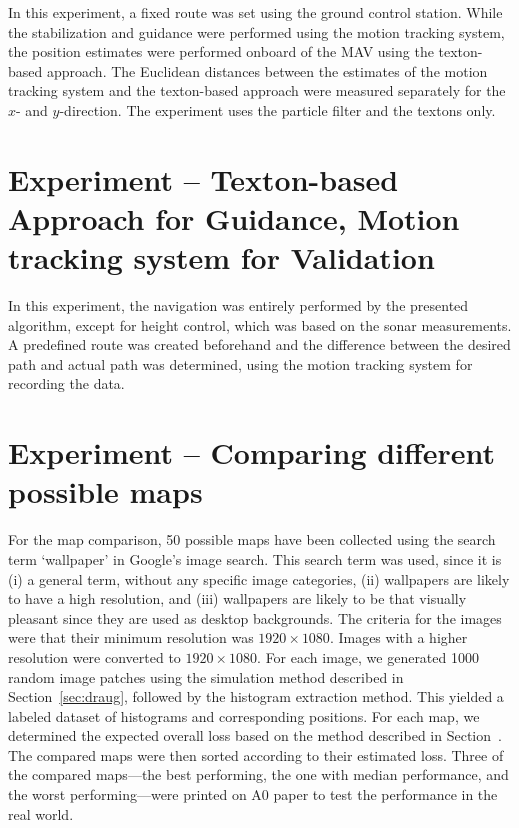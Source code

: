 In this experiment, a fixed route was set using the ground control
station. While the stabilization and guidance were performed using
the motion tracking system, the position estimates were performed onboard
of the MAV using the texton-based approach. The Euclidean distances between the estimates of the motion tracking system and the texton-based approach
were measured separately for the $x$- and $y$-direction. The experiment uses the
particle filter and the textons only.

\section{Experiment -- Texton-based Approach for Guidance, Motion tracking system for Validation}
\label{sec:experiment-6}

In this experiment, the navigation was entirely performed by
the presented algorithm, except for height control, which was based on
the sonar measurements. A predefined route was created beforehand and
the difference between the desired path and actual path was
determined, using the motion tracking system for recording the data.

\section{Experiment -- Comparing different possible maps}

For the map comparison, 50 possible maps have been collected using the
search term `wallpaper' in Google's image search. This search term was
used, since it is (i) a general term, without any specific image
categories, (ii) wallpapers are likely to have a high resolution, and
(iii) wallpapers are likely to be that visually pleasant since they
are used as desktop backgrounds. The criteria for the images were that
their minimum resolution was $1920 \times 1080$. Images with a higher
resolution were converted to $1920 \times 1080$.  For each image, we
generated 1000 random image patches using the simulation method
described in Section~\ref{sec:draug}, followed by the histogram
extraction method. This yielded a labeled dataset of histograms and
corresponding positions. For each map, we determined the expected
overall loss based on the method described in
Section~\label{sec:mapeval}. The compared maps were then sorted
according to their estimated loss. Three of the compared maps---the
best performing, the one with median performance, and the worst
performing---were printed on A0 paper to test the performance in the
real world.
